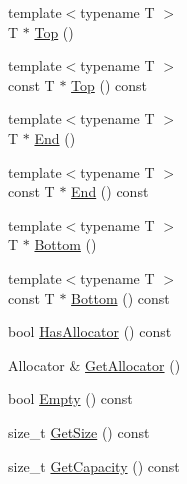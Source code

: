 \begin{DoxyCompactItemize}
\item 
{\footnotesize template$<$typename T $>$ }\\T $\ast$ \hyperlink{classinternal_1_1Stack_ab3ed5b4afed3c73c516678516d5e195b}{Top} ()
\item 
{\footnotesize template$<$typename T $>$ }\\const T $\ast$ \hyperlink{classinternal_1_1Stack_abd8941a6b827a7ea359cb59b79d7a886}{Top} () const
\item 
{\footnotesize template$<$typename T $>$ }\\T $\ast$ \hyperlink{classinternal_1_1Stack_a54987ae8ad774dd3ee80a43d268ef080}{End} ()
\item 
{\footnotesize template$<$typename T $>$ }\\const T $\ast$ \hyperlink{classinternal_1_1Stack_a605246623b39f9d36d3d12eee25f9d82}{End} () const
\item 
{\footnotesize template$<$typename T $>$ }\\T $\ast$ \hyperlink{classinternal_1_1Stack_a10aa1bc716b82cb0a40b3a3b9d5efe87}{Bottom} ()
\item 
{\footnotesize template$<$typename T $>$ }\\const T $\ast$ \hyperlink{classinternal_1_1Stack_af5c55983c553c7355ff6d24beb48c722}{Bottom} () const
\item 
bool \hyperlink{classinternal_1_1Stack_a657ae4d477b25d4e0045aee0efd809c3}{Has\+Allocator} () const
\item 
Allocator \& \hyperlink{classinternal_1_1Stack_ab01f693833dfe136f574d66547623cfa}{Get\+Allocator} ()
\item 
bool \hyperlink{classinternal_1_1Stack_a2b8bda380e33838a99e3c73ff9785f03}{Empty} () const
\item 
size\+\_\+t \hyperlink{classinternal_1_1Stack_ac484468a2791bd3e9ba609bd1600ab48}{Get\+Size} () const
\item 
size\+\_\+t \hyperlink{classinternal_1_1Stack_a67d5d7ee9424d3dd46cf9d001b6cdc6b}{Get\+Capacity} () const
\end{DoxyCompactItemize}
